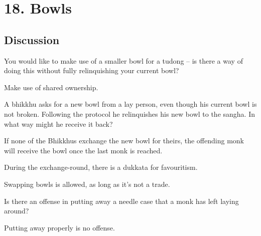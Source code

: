 \chapter{18. Bowls}
\renewcommand*{\theChapterTitle}{18. Bowls}

\section*{Discussion}


You would like to make use of a smaller bowl for a tudong – is there a way of
doing this without fully relinquishing your current bowl?

\begin{solution}
  Make use of shared ownership.
\end{solution}

  \bigskip


A bhikkhu asks for a new bowl from a lay person, even though his current bowl is not broken.
Following the protocol he relinquishes his new bowl to the sangha. In what way
might he receive it back?

\begin{solution}
  If none of the Bhikkhus exchange the new bowl for theirs, the offending
  monk will receive the bowl once the last monk is reached.

  During the exchange-round, there is a dukkata for favouritism.

  Swapping bowls is allowed, as long as it's not a trade.
\end{solution}

\bigskip


Is there an offense in putting away a needle case that a monk has left laying around? 

\begin{solution}
  Putting away properly is no offense.
\end{solution}

